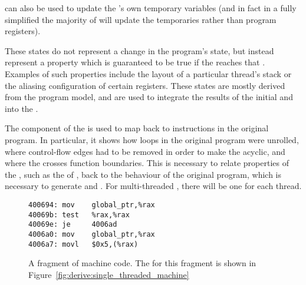 \begin{description}
  can also be used to update the {\StateMachine}'s own temporary
  variables (and in fact in a fully simplified {\StateMachine} the
  majority of  will update the
  {\StateMachine} temporaries rather than program registers).
\item[\introduction{Annotation states}] These states do not represent
  a change in the program's state, but instead represent a property
  which is guaranteed to be true if the {\StateMachine} reaches that
  .  Examples of such properties include the
  layout of a particular thread's stack or the aliasing configuration
  of certain registers.  These states are mostly derived from the
  program model, and are used to integrate the results of the initial
   and  into the
  {\StateMachines}.
\end{description}

The  component of the {\StateMachine} is used to map
 back to instructions in the original
program.  In particular, it shows how loops in the original program
were unrolled, where control-flow edges had to be removed in order to
make the  acyclic, and where the 
crosses function boundaries.  This is necessary to relate properties
of the {\StateMachines}, such as the 
of , back to the behaviour of the original
program, which is necessary to generate  and
.  For multi-threaded {\StateMachines}, there will be
one  for each thread.

\begin{figure}
\begin{verbatim}
400694: mov    global_ptr,%rax
40069b: test   %rax,%rax
40069e: je     4006ad
4006a0: mov    global_ptr,%rax
4006a7: movl   $0x5,(%rax)
\end{verbatim}
\caption{A fragment of machine code.  The {\StateMachine} for this fragment is shown in Figure~\ref{fig:derive:single_threaded_machine}}
\label{fig:derive:single_threaded_machine_inp}
\end{figure}

